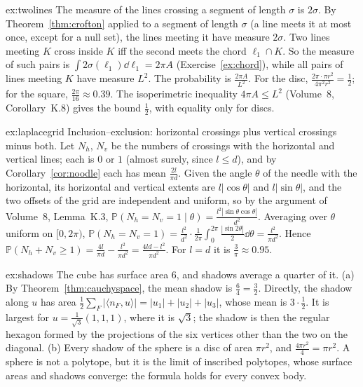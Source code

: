 \begin{solution}{ex:twolines}
\idea The measure of the lines crossing a segment of length $\sigma$ is $2\sigma$.
\writeup By Theorem~\ref{thm:crofton} applied to a segment of length $\sigma$ (a line meets it at most once, except for a null set), the lines meeting it have measure $2\sigma$. Two lines meeting $K$ cross inside $K$ iff the second
meets the chord $\ell_1\cap K$. So the measure of such pairs is $\int2\sigma(\ell_1)\dd\ell_1=2\pi A$ (Exercise~\ref{ex:chord}), while all pairs of lines meeting $K$ have measure $L^2$. The probability is $\frac{2\pi A}{L^2}$. For the disc,
$\frac{2\pi\cdot\pi r^2}{4\pi^2r^2}=\frac12$; for the square, $\frac{2\pi}{16}\approx0.39$. The isoperimetric inequality $4\pi A\le L^2$ (Volume~8, Corollary~K.8) gives the bound $\frac12$, with equality only for discs.
\end{solution}

\begin{solution}{ex:laplacegrid}
\idea Inclusion--exclusion: horizontal crossings plus vertical crossings minus both.
\writeup Let $N_h$, $N_v$ be the numbers of crossings with the horizontal and vertical lines; each is $0$ or $1$ (almost surely, since $l\le d$), and by Corollary~\ref{cor:noodle} each has mean $\frac{2l}{\pi d}$. Given the angle $\theta$ of
the needle with the horizontal, its horizontal and vertical extents are $l|\cos\theta|$ and $l|\sin\theta|$, and the two offsets of the grid are independent and uniform, so by the argument of Volume~8, Lemma~K.3,
$\mathbb P(N_h=N_v=1\mid\theta)=\frac{l^2|\sin\theta\cos\theta|}{d^2}$. Averaging over $\theta$ uniform on $[0,2\pi)$, $\mathbb P(N_h=N_v=1)=\frac{l^2}{d^2}\cdot\frac1{2\pi}\int_0^{2\pi}\frac{|\sin2\theta|}2\dd\theta=\frac{l^2}{\pi d^2}$. Hence
$\mathbb P(N_h+N_v\ge1)=\frac{4l}{\pi d}-\frac{l^2}{\pi d^2}=\frac{4ld-l^2}{\pi d^2}$. For $l=d$ it is $\frac3\pi\approx0.95$.
\end{solution}

\begin{solution}{ex:shadows}
\idea The cube has surface area $6$, and shadows average a quarter of it.
\writeup (a) By Theorem~\ref{thm:cauchyspace}, the mean shadow is $\frac64=\frac32$. Directly, the shadow along $u$ has area $\frac12\sum_F|\langle n_F,u\rangle|=|u_1|+|u_2|+|u_3|$, whose mean is $3\cdot\frac12$. It is largest for
$u=\frac1{\sqrt3}(1,1,1)$, where it is $\sqrt3$; the shadow is then the regular hexagon formed by the projections of the six vertices other than the two on the diagonal. (b) Every shadow of the
sphere is a disc of area $\pi r^2$, and $\frac{4\pi r^2}4=\pi r^2$. A sphere is not a polytope, but it is the limit of inscribed polytopes, whose surface areas and shadows converge: the formula holds for
every convex body.
\end{solution}

